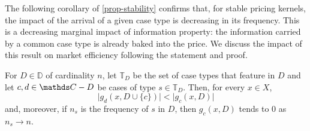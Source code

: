 \documentclass[12pt,a4paper,twoside]{article}
\newcommand{\mbbd}{{\mathds D}}
\newcommand{\mbbc}{{\mathds C}}
\newcommand{\mbbt}{{\mathds {T}}}
\begin{document}
The following corollary of \cref{prop-stability} confirms that, for stable
pricing kernels, the impact of the arrival of a given case type is decreasing
in its frequency.  This is a decreasing marginal impact of information
property: the information carried by a common case type is already baked into
the price.  We discuss the impact of this result on market efficiency following
the statement and proof.
\begin{corollary}\label{cor-efficiency}
  For $D \in \mbbd$ of cardinality $n$, let $\mbbt_D$ be the set of case types
  that feature in $D$ and let $c, d \in \mbbc \bs D$ be cases of type $s \in
  \mbbt_D$. %
  Then, for every $x \in X$,
  \begin{equation*}
    \lvert g_{d}(x, D\cup \{c\}) \rvert < \lvert g_c(x, D)\rvert
  \end{equation*}
  and, moreover, if $n_s$ is the frequency of $s$ in $D$, then $g_c(x, D)$
  tends to $0$ as $n_s \rightarrow n$. 
\end{corollary}
\end{document}
